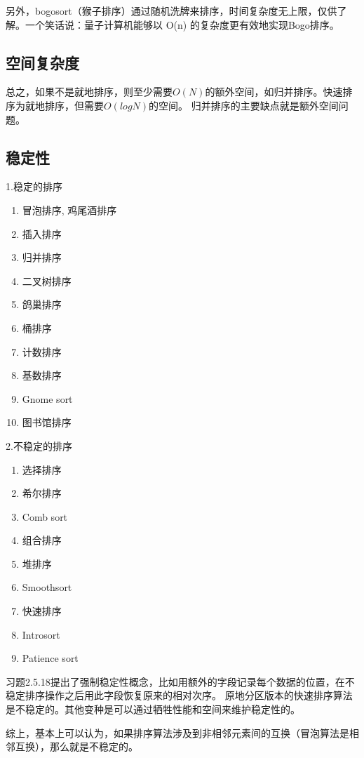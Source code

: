 另外，bogosort（猴子排序）通过随机洗牌来排序，时间复杂度无上限，仅供了解。一个笑话说：量子计算机能够以 O(n) 的复杂度更有效地实现Bogo排序。


\subsection{空间复杂度}
总之，如果不是就地排序，则至少需要$O(N)$的额外空间，如归并排序。快速排序为就地排序，但需要$O(logN)$的空间。
归并排序的主要缺点就是额外空间问题。

\subsection{稳定性}
\cite{weijipedia}
1.稳定的排序
\begin{enumerate}
	\item 冒泡排序, 鸡尾酒排序
	\item 插入排序
	\item 归并排序
	\item 二叉树排序
	\item 鸽巢排序
	\item 桶排序
	\item 计数排序
	\item 基数排序
	\item Gnome sort
	\item 图书馆排序
	\end{enumerate}

	2.不稳定的排序

	\begin{enumerate}
	\item 选择排序
	\item 希尔排序
	\item Comb sort
	\item 组合排序
	\item 堆排序
	\item Smoothsort
	\item 快速排序
	\item Introsort
	\item Patience sort
    \end{enumerate}

\cite{sedgewick}习题2.5.18提出了强制稳定性概念，比如用额外的字段记录每个数据的位置，在不稳定排序操作之后用此字段恢复原来的相对次序。
原地分区版本的快速排序算法是不稳定的。其他变种是可以通过牺牲性能和空间来维护稳定性的\cite{weijipedia}。

综上，基本上可以认为，如果排序算法涉及到非相邻元素间的互换（冒泡算法是相邻互换），那么就是不稳定的。



